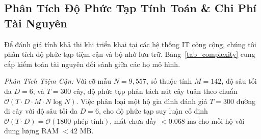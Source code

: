 \documentclass[conference]{IEEEtran}
\begin{document}
\subsection{Phân Tích Độ Phức Tạp Tính Toán & Chi Phí Tài Nguyên}
Để đánh giá tính khả thi khi triển khai tại các hệ thống IT công cộng, chúng tôi phân tích độ phức tạp tiệm cận và bộ nhớ lưu trữ. Bảng~\ref{tab_complexity} cung cấp kiểm toán tài nguyên đối sánh giữa các họ mô hình.

\begin{table}[htbp]
\caption{Kiểm Toán Tài Nguyên Tính Toán và Độ Trễ Suy Luận Đa Mô Hình}
\begin{center}
\label{tab_complexity}
\end{center}
\end{table}

\textit{Phân Tích Tiệm Cận:} Với cỡ mẫu $N=9,557$, số thuộc tính $M=142$, độ sâu tối đa $D=6$, và $T=300$ cây, độ phức tạp phân tách nút cây tuân theo chuẩn $\mathcal{O}(T \cdot D \cdot M \cdot N \log N)$. Việc phân loại một hộ gia đình đánh giá $T=300$ đường đi cây với độ sâu tối đa $D=6$, cho độ phức tạp suy luận cố định $\mathcal{O}(T \cdot D) = \mathcal{O}(1800 \text{ phép tính})$, mất chưa đầy $<0.068\text{ ms}$ cho mỗi hộ với dung lượng RAM $<42\text{ MB}$.
\end{document}
